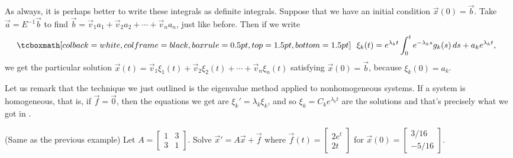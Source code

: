 \medskip

As always,
it is perhaps better to write these integrals as definite integrals.  
Suppose that we have an initial condition $\vec{x}(0) = \vec{b}$.
Take $\vec{a} = E^{-1} \vec{b}$ to find
$\vec{b} = \vec{v}_1 a_1 + \vec{v}_2 a_2 + \cdots + \vec{v}_n a_n$,
just like before.
Then if we write 
\begin{equation*}
\mybxbg{~~
\xi_k(t) =  e^{\lambda_k t} 
\int_0^t e^{-\lambda_k s} g_k(s) \,ds + a_k e^{\lambda_k t} ,
~~}
\end{equation*}
we get the particular solution
$\vec{x}(t) =
\vec{v}_1 \xi_1(t) + 
\vec{v}_2 \xi_2(t) + \cdots +
\vec{v}_n \xi_n(t)$ satisfying $\vec{x}(0) = \vec{b}$,
because $\xi_k(0) = a_k$.

Let us remark that the technique we just outlined is the eigenvalue
method applied to nonhomogeneous systems.  If a system is homogeneous, that
is, if $\vec{f}=\vec{0}$, then the equations we get are
$\xi_k' = \lambda_k \xi_k$, and so $\xi_k = C_k e^{\lambda_k t}$ are the
solutions and that's precisely what we got in
.


\begin{example} (Same as the previous example)
Let $A = \left[
\begin{smallmatrix}
1 & 3 \\
3 & 1
\end{smallmatrix} \right]$.
Solve ${\vec{x}}' = A \vec{x} +
\vec{f}$ where $\vec{f}(t) = 
\left[ \begin{smallmatrix}
2e^t \\
2t
\end{smallmatrix} \right]$ for $\vec{x}(0) =
\left[ \begin{smallmatrix}
3/16 \\
-5/16
\end{smallmatrix} \right]$.
\end{example}

